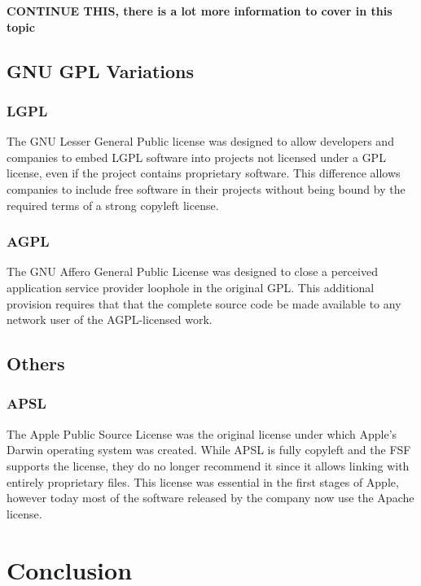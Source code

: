 \documentclass[12pt,letterpaper]{article}
\begin{document}
\textbf{CONTINUE THIS, there is a lot more information to cover in this topic}

\subsection{GNU GPL Variations}

\subsubsection{LGPL}

The GNU Lesser General Public license was designed to allow developers and companies to embed LGPL software into projects not licensed under a GPL license, even if the project contains proprietary software. This difference allows companies to include free software in their projects without being bound by the required terms of a strong copyleft license.

\subsubsection{AGPL}

The GNU Affero General Public License was designed to close a perceived application service provider loophole in the original GPL. This additional provision requires that  that the complete source code be made available to any network user of the AGPL-licensed work.

\subsection{Others}

\subsubsection{APSL}

The Apple Public Source License was the original license under which Apple's Darwin operating system was created. While APSL is fully copyleft and the FSF supports the license, they do no longer recommend it since it allows linking with entirely proprietary files. This license was essential in the first stages of Apple, however today most of the software released by the company now use the Apache license.

\section{Conclusion}
\end{document}
